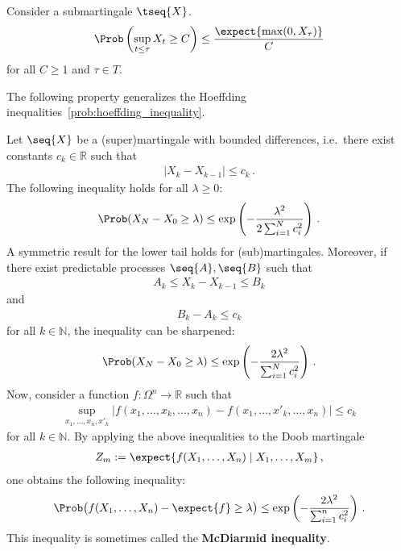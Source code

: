     \begin{property}\label{prob:doob_inequality}
        Consider a \cdlg submartingale $\tseq{X}$.
        \begin{gather}
            \Prob\left(\sup_{t\leq\tau}X_t\geq C\right)\leq\frac{\expect{\max(0,X_\tau)}}{C}
        \end{gather}
        for all $C\geq1$ and $\tau\in T$.
    \end{property}

    The following property generalizes the Hoeffding inequalities~\cref{prob:hoeffding_inequality}.
    \begin{property}\label{prob:hoeffding_azuma}
        Let $\seq{X}$ be a (super)martingale with bounded differences, i.e.~there exist constants $c_k\in\mathbb{R}$ such that
        \begin{gather}
            |X_k-X_{k-1}|\leq c_k\,.
        \end{gather}
        The following inequality holds for all $\lambda\geq0$:
        \begin{gather}
            \Prob(X_N-X_0\geq\lambda)\leq\exp\left(-\frac{\lambda^2}{2\sum_{i=1}^Nc_i^2}\right)\,.
        \end{gather}
        A symmetric result for the lower tail holds for (sub)martingales. Moreover, if there exist predictable processes $\seq{A},\seq{B}$ such that
        \begin{gather}
            A_k\leq X_k-X_{k-1}\leq B_k
        \end{gather}
        and
        \begin{gather}
            B_k-A_k\leq c_k
        \end{gather}
        for all $k\in\mathbb{N}$, the inequality can be sharpened:
        \begin{gather}
            \Prob(X_N-X_0\geq\lambda)\leq\exp\left(-\frac{2\lambda^2}{\sum_{i=1}^Nc_i^2}\right)\,.
        \end{gather}
        Now, consider a function $f:\Omega^n\rightarrow\mathbb{R}$ such that
        \begin{gather}
            \sup_{x_1,\ldots,x_n,x'_k}|f(x_1,\ldots,x_k,\ldots,x_n)-f(x_1,\ldots,x'_k,\ldots,x_n)|\leq c_k
        \end{gather}
        for all $k\in\mathbb{N}$. By applying the above inequalities to the Doob martingale
        \begin{gather}
            Z_m:=\expect{f(X_1,\ldots,X_n)\mid X_1,\ldots,X_m}\,,
        \end{gather}
        one obtains the following inequality:
        \begin{gather}
            \Prob\bigl(f(X_1,\ldots,X_n)-\expect{f}\geq\lambda\bigr)\leq\exp\left(-\frac{2\lambda^2}{\sum_{i=1}^nc_i^2}\right)\,.
        \end{gather}
        This inequality is sometimes called the \textbf{McDiarmid inequality}.
    \end{property}


